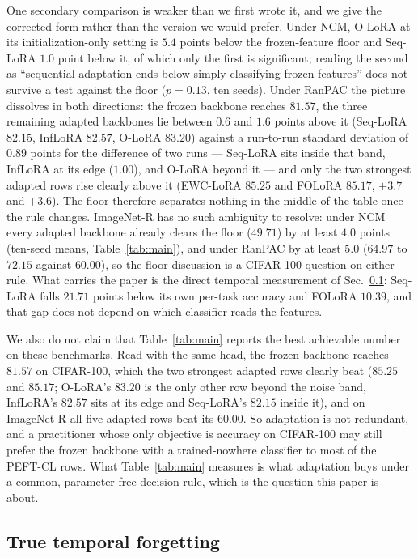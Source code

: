 One secondary comparison is weaker than we first wrote it, and we give the corrected form
rather than the version we would prefer. Under NCM, O-LoRA at its initialization-only setting
is $5.4$ points below the frozen-feature floor and Seq-LoRA $1.0$ point below it, of which only
the first is significant; reading the second as ``sequential adaptation ends below simply
classifying frozen features'' does not survive a test against the floor ($p=0.13$, ten seeds).
Under RanPAC the picture dissolves in both directions: the frozen backbone reaches $81.57$, the
three remaining adapted backbones lie between $0.6$ and $1.6$ points above it (Seq-LoRA
$82.15$, InfLoRA $82.57$, O-LoRA $83.20$) against a run-to-run standard deviation of $0.89$
points for the difference of two runs --- Seq-LoRA sits inside that band, InfLoRA at its edge
($1.00$), and O-LoRA beyond it --- and only the two
strongest adapted rows rise clearly above it (EWC-LoRA
$85.25$ and FOLoRA $85.17$, $+3.7$ and $+3.6$). The floor therefore separates nothing in the
middle of the table once the rule changes. ImageNet-R has no such ambiguity to resolve: under NCM every adapted backbone
already clears the floor ($49.71$) by at least $4.0$ points (ten-seed means,
Table~\ref{tab:main}), and under RanPAC by at least $5.0$ ($64.97$ to $72.15$ against
$60.00$), so the floor discussion is a CIFAR-100 question
on either rule. What carries the paper is the direct temporal measurement of
Sec.~\ref{sec:forgetting}: Seq-LoRA falls $21.71$ points below its own per-task accuracy and
FOLoRA $10.39$, and that gap does not depend on which classifier reads the features.

We also do not claim that Table~\ref{tab:main} reports the best achievable number on these
benchmarks. Read with the same head, the frozen backbone reaches $81.57$ on CIFAR-100, which the
two strongest adapted rows clearly beat ($85.25$ and $85.17$; O-LoRA's $83.20$ is the only other
row beyond the noise band, InfLoRA's $82.57$ sits at its edge and Seq-LoRA's $82.15$ inside it),
and on ImageNet-R all five adapted rows
beat its $60.00$. So
adaptation is not redundant, and a practitioner whose only objective is accuracy on CIFAR-100 may
still prefer the frozen backbone with a trained-nowhere classifier to most of the PEFT-CL rows.
What Table~\ref{tab:main} measures is what adaptation buys under a common, parameter-free
decision rule, which is the question this paper is about.

\subsection{True temporal forgetting}
\label{sec:forgetting}

